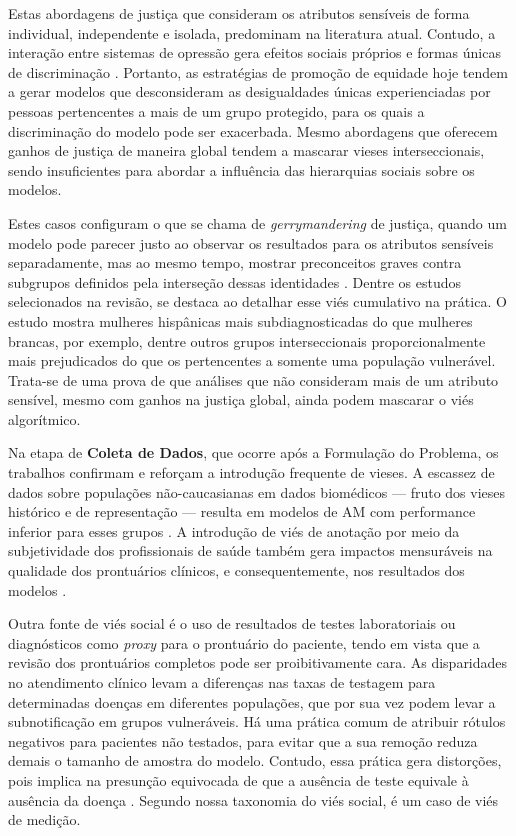 Estas abordagens de justiça que consideram os atributos sensíveis de forma individual, independente e isolada, predominam na literatura atual. Contudo, a interação entre sistemas de opressão gera efeitos sociais próprios e formas únicas de discriminação \cite{crenshaw2022demarginalizing,buolamwini2018gender}. Portanto, as estratégias de promoção de equidade hoje tendem a gerar modelos que desconsideram as desigualdades únicas experienciadas por pessoas pertencentes a mais de um grupo protegido, para os quais a discriminação do modelo pode ser exacerbada. Mesmo abordagens que oferecem ganhos de justiça de maneira global tendem a mascarar vieses interseccionais, sendo insuficientes para abordar a influência das hierarquias sociais sobre os modelos.

Estes casos configuram o que se chama de \textit{gerrymandering} de justiça, quando um modelo pode parecer justo ao observar os resultados para os atributos sensíveis separadamente, mas ao mesmo tempo, mostrar preconceitos graves contra subgrupos definidos pela interseção dessas identidades \cite{kearns2018preventing}. Dentre os estudos selecionados na revisão, \citet{seyyed2021underdiagnosis} se destaca ao detalhar esse viés cumulativo na prática. O estudo mostra mulheres hispânicas mais subdiagnosticadas do que mulheres brancas, por exemplo, dentre outros grupos interseccionais proporcionalmente mais prejudicados do que os pertencentes a somente uma população vulnerável. Trata-se de uma prova de que análises que não consideram mais de um atributo sensível, mesmo com ganhos na justiça global, ainda podem mascarar o viés algorítmico.

Na etapa de \textbf{Coleta de Dados}, que ocorre após a Formulação do Problema, os trabalhos confirmam e reforçam a introdução frequente de vieses. A escassez de dados sobre populações não-caucasianas em dados biomédicos — fruto dos vieses histórico e de representação — resulta em modelos de AM com performance inferior para esses grupos \cite{afrose2022subpopulation,burlina2021addressing,gao2020deep,roosli2022peeking}. A introdução de viés de anotação por meio da subjetividade dos profissionais de saúde também gera impactos mensuráveis na qualidade dos prontuários clínicos, e consequentemente, nos resultados dos modelos \cite{afshar2022development}.

Outra fonte de viés social é o uso de resultados de testes laboratoriais ou diagnósticos como \textit{proxy} para o prontuário do paciente, tendo em vista que a revisão dos prontuários completos pode ser proibitivamente cara. As disparidades no atendimento clínico levam a diferenças nas taxas de testagem para determinadas doenças em diferentes populações, que por sua vez podem levar a subnotificação em grupos vulneráveis. Há uma prática comum de atribuir rótulos negativos para pacientes não testados, para evitar que a sua remoção reduza demais o tamanho de amostra do modelo. Contudo, essa prática gera distorções, pois implica na presunção equivocada de que a ausência de teste equivale à ausência da doença \cite{chang2208disparate}. Segundo nossa taxonomia do viés social, é um caso de viés de medição.

